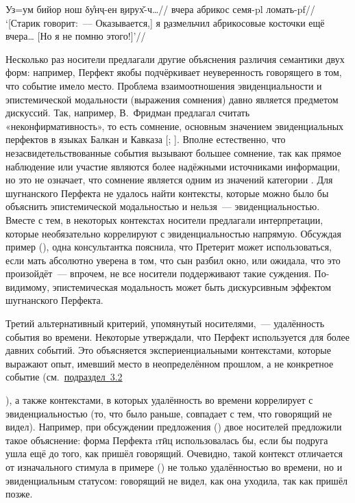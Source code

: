 {{{{
\begingl
\gla Уз=ум бийор нош δу̊нҷ-ен \b{вирух̌-ч}…//
 вчера абрикос семя-{\sc pl} ломать-{\sc pf}//
\glft ‘[Старик говорит:~— Оказывается,] я \b{размельчил} абрикосовые косточки ещё вчера… [Но я не помню этого!]’//
\endgl \xe

Несколько раз носители предлагали другие объяснения различия семантики двух форм: например, Перфект якобы подчёркивает неуверенность говорящего в том, что событие имело место. Проблема взаимоотношения эвиденциальности и эпистемической модальности (выражения сомнения) давно является предметом дискуссий. Так, например, В.~Фридман предлагал считать «неконфирмативность», то есть сомнение, основным значением эвиденциальных перфектов в языках Балкан и Кавказа [\cite{friedman1979}; \cite*{friedman2003}]. Вполне естественно, что незасвидетельствованные события вызывают большее сомнение, так как прямое наблюдение или участие являются более надёжными источниками информации, но это не означает, что сомнение является одним из значений категории \parencite[3]{arslan2020}. Для шугнанского Перфекта не удалось найти контексты, которые можно было бы объяснить эпистемической модальностью и нельзя~— эвиденциальностью. Вместе с тем, в некоторых контекстах носители предлагали интерпретации, которые необязательно коррелируют с эвиденциальностью напрямую. Обсуждая пример (), одна консультантка пояснила, что Претерит может использоваться, если мать абсолютно уверена в том, что сын разбил окно, или ожидала, что это произойдёт~— впрочем, не все носители поддерживают такие суждения. По-видимому, эпистемическая модальность может быть дискурсивным эффектом шугнанского Перфекта.

Третий альтернативный критерий, упомянутый носителями,~— удалённость события во времени. Некоторые утверждали, что Перфект используется для более давних событий. Это объясняется экспериенциальными контекстами, которые выражают опыт, имевший место в неопределённом прошлом, а не конкретное событие (см.~\hyperref[evid-exper]{подраздел~3.2}}), а также контекстами, в которых удалённость во времени коррелирует с эвиденциальностью (то, что было раньше, совпадает с тем, что говорящий не видел). Например, при обсуждении предложения () двое носителей предложили такое объяснение: форма Перфекта \i{тӣц} использовалась бы, если бы подруга ушла ещё до того, как пришёл говорящий. Очевидно, такой контекст отличается от изначального стимула в примере () не только удалённостью во времени, но и эвиденциальным статусом: говорящий не видел, как она уходила, так как пришёл позже.

}}}
